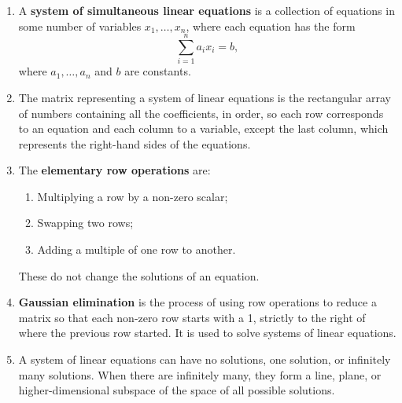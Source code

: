 \documentclass{article}
\begin{document}
\begin{enumerate}
	\item A \textbf{system of simultaneous linear equations} is a collection of equations in some number of variables $x_1,\hdots,x_n$, where each equation has the form
		\[\sum_{i=1}^n a_ix_i=b,\]
		where $a_1,\hdots,a_n$ and $b$ are constants.
	\item The matrix representing a system of linear equations is the rectangular array of numbers containing all the coefficients, in order, so each row corresponds to an equation and each column to a variable, except the last column, which represents the right-hand sides of the equations.
	\item The \textbf{elementary row operations} are:
		\begin{enumerate}
			\item Multiplying a row by a non-zero scalar;
			\item Swapping two rows;
			\item Adding a multiple of one row to another.
		\end{enumerate}
		These do not change the solutions of an equation.
	\item \textbf{Gaussian elimination} is the process of using row operations to reduce a matrix so that each non-zero row starts with a 1, strictly to the right of where the previous row started. It is used to solve systems of linear equations.
	\item A system of linear equations can have no solutions, one solution, or infinitely many solutions. When there are infinitely many, they form a line, plane, or higher-dimensional subspace of the space of all possible solutions.
\end{enumerate}
\end{document}
